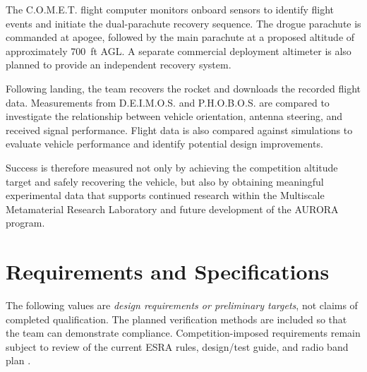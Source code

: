 \documentclass[11pt]{IEEEtran}
\newcommand{\comet}{C.O.M.E.T.}
\newcommand{\phobos}{P.H.O.B.O.S.}
\newcommand{\deimos}{D.E.I.M.O.S.}
\begin{document}
The \comet{} flight computer monitors onboard sensors
to identify flight events and initiate the dual-parachute
recovery sequence. The drogue parachute is commanded at
apogee, followed by the main parachute at a proposed
altitude of approximately 700~ft AGL. A separate commercial
deployment altimeter is also planned to provide an
independent recovery system.

Following landing, the team recovers the rocket and
downloads the recorded flight data. Measurements from
\deimos{} and \phobos{} are compared to investigate the
relationship between vehicle orientation, antenna steering,
and received signal performance. Flight data is also
compared against simulations to evaluate vehicle performance
and identify potential design improvements.

Success is therefore measured not only by achieving the
competition altitude target and safely recovering the
vehicle, but also by obtaining meaningful experimental
data that supports continued research within the
Multiscale Metamaterial Research Laboratory and future
development of the AURORA program.
\section{Requirements and Specifications}
The following values are \emph{design requirements or preliminary targets}, not claims of completed qualification. The planned verification methods are included so that the team can demonstrate compliance. Competition-imposed requirements remain subject to review of the current ESRA rules, design/test guide, and radio band plan \cite{irecRules,irecGuide,irecBand}.
\end{document}
